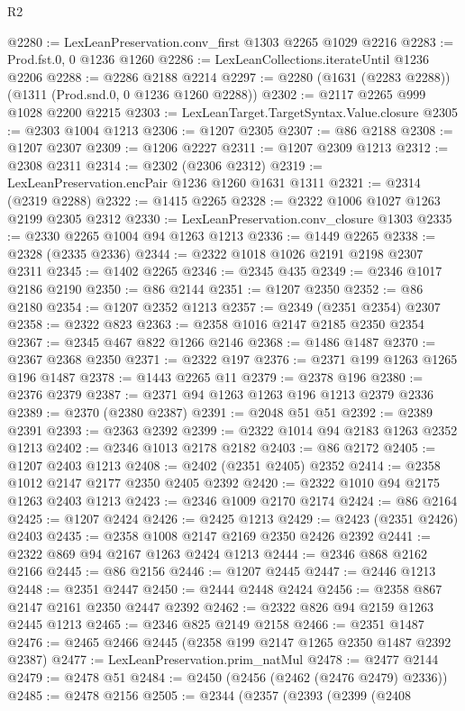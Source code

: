 \begin{lexlean}{R2}
\begin{coremodule}
@2280 := LexLeanPreservation.conv_first @1303 @2265 @1029 @2216
@2283 := Prod.fst.{0, 0} @1236 @1260
@2286 := LexLeanCollections.iterateUntil @1236 @2206
@2288 := @2286 @2188 @2214
@2297 := @2280 (@1631 (@2283 @2288)) (@1311 (Prod.snd.{0, 0} @1236 @1260 @2288))
@2302 := @2117 @2265 @999 @1028 @2200 @2215
@2303 := LexLeanTarget.TargetSyntax.Value.closure
@2305 := @2303 @1004 @1213
@2306 := @1207 @2305
@2307 := @86 @2188
@2308 := @1207 @2307
@2309 := @1206 @2227
@2311 := @1207 @2309 @1213
@2312 := @2308 @2311
@2314 := @2302 (@2306 @2312)
@2319 := LexLeanPreservation.encPair @1236 @1260 @1631 @1311
@2321 := @2314 (@2319 @2288)
@2322 := @1415 @2265
@2328 := @2322 @1006 @1027 @1263 @2199 @2305 @2312
@2330 := LexLeanPreservation.conv_closure @1303
@2335 := @2330 @2265 @1004 @94 @1263 @1213
@2336 := @1449 @2265
@2338 := @2328 (@2335 @2336)
@2344 := @2322 @1018 @1026 @2191 @2198 @2307 @2311
@2345 := @1402 @2265
@2346 := @2345 @435
@2349 := @2346 @1017 @2186 @2190
@2350 := @86 @2144
@2351 := @1207 @2350
@2352 := @86 @2180
@2354 := @1207 @2352 @1213
@2357 := @2349 (@2351 @2354) @2307
@2358 := @2322 @823
@2363 := @2358 @1016 @2147 @2185 @2350 @2354
@2367 := @2345 @467 @822 @1266 @2146
@2368 := @1486 @1487
@2370 := @2367 @2368 @2350
@2371 := @2322 @197
@2376 := @2371 @199 @1263 @1265 @196 @1487
@2378 := @1443 @2265 @11
@2379 := @2378 @196
@2380 := @2376 @2379
@2387 := @2371 @94 @1263 @1263 @196 @1213 @2379 @2336
@2389 := @2370 (@2380 @2387)
@2391 := @2048 @51 @51
@2392 := @2389 @2391
@2393 := @2363 @2392
@2399 := @2322 @1014 @94 @2183 @1263 @2352 @1213
@2402 := @2346 @1013 @2178 @2182
@2403 := @86 @2172
@2405 := @1207 @2403 @1213
@2408 := @2402 (@2351 @2405) @2352
@2414 := @2358 @1012 @2147 @2177 @2350 @2405 @2392
@2420 := @2322 @1010 @94 @2175 @1263 @2403 @1213
@2423 := @2346 @1009 @2170 @2174
@2424 := @86 @2164
@2425 := @1207 @2424
@2426 := @2425 @1213
@2429 := @2423 (@2351 @2426) @2403
@2435 := @2358 @1008 @2147 @2169 @2350 @2426 @2392
@2441 := @2322 @869 @94 @2167 @1263 @2424 @1213
@2444 := @2346 @868 @2162 @2166
@2445 := @86 @2156
@2446 := @1207 @2445
@2447 := @2446 @1213
@2448 := @2351 @2447
@2450 := @2444 @2448 @2424
@2456 := @2358 @867 @2147 @2161 @2350 @2447 @2392
@2462 := @2322 @826 @94 @2159 @1263 @2445 @1213
@2465 := @2346 @825 @2149 @2158
@2466 := @2351 @1487
@2476 := @2465 @2466 @2445 (@2358 @199 @2147 @1265 @2350 @1487 @2392 @2387)
@2477 := LexLeanPreservation.prim_natMul
@2478 := @2477 @2144
@2479 := @2478 @51
@2484 := @2450 (@2456 (@2462 (@2476 @2479) @2336))
@2485 := @2478 @2156
@2505 := @2344
    (@2357
      (@2393
        (@2399
          (@2408

\end{coremodule}
\end{lexlean}
